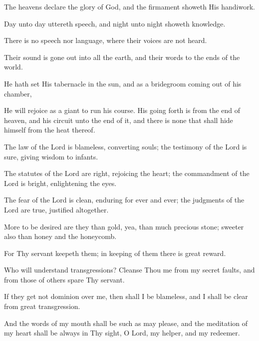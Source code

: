 The heavens declare the glory of God, and the firmament showeth His handiwork.

Day unto day uttereth speech, and night unto night showeth knowledge.

There is no speech nor language, where their voices are not heard.

Their sound is gone out into all the earth, and their words to the ends of the world.

He hath set His tabernacle in the sun, and as a bridegroom coming out of his chamber,

He will rejoice as a giant to run his course. His going forth is from the end of heaven, and his circuit unto the end of it, and there is none that shall hide himself from the heat thereof.

The law of the Lord is blameless, converting souls; the testimony of the Lord is sure, giving wisdom to infants.

The statutes of the Lord are right, rejoicing the heart; the commandment of the Lord is bright, enlightening the eyes.

The fear of the Lord is clean, enduring for ever and ever; the judgments of the Lord are true, justified altogether.

More to be desired are they than gold, yea, than much precious stone; sweeter also than honey and the honeycomb.

For Thy servant keepeth them; in keeping of them there is great reward.

Who will understand transgressions? Cleanse Thou me from my secret faults, and from those of others spare Thy servant.

If they get not dominion over me, then shall I be blameless, and I shall be clear from great transgression.

And the words of my mouth shall be such as may please, and the meditation of my heart shall be always in Thy sight, O Lord, my helper, and my redeemer.
